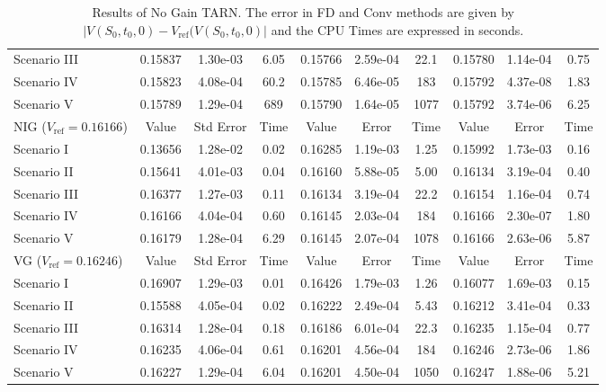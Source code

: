 \begin{table}
\begin{tabular}{l||c|c|c||c|c|c||c|c|c}
    Scenario III & 0.15837 & 1.30e-03 & 6.05 & 0.15766 & 2.59e-04 & 22.1 & 0.15780 & 1.14e-04 & 0.75 \\
    Scenario IV  & 0.15823 & 4.08e-04 & 60.2 & 0.15785 & 6.46e-05 & 183  & 0.15792 & 4.37e-08 & 1.83 \\
    Scenario V   & 0.15789 & 1.29e-04 & 689  & 0.15790 & 1.64e-05 & 1077 & 0.15792 & 3.74e-06 & 6.25 \\
         \midrule
      NIG ($V_\text{ref}=0.16166$) & Value & Std Error  & Time & Value & Error & Time & Value & Error & Time \\
      \midrule
    Scenario I   & 0.13656 & 1.28e-02 & 0.02 & 0.16285 & 1.19e-03 & 1.25 & 0.15992 & 1.73e-03 & 0.16\\
    Scenario II  & 0.15641 & 4.01e-03 & 0.04 & 0.16160 & 5.88e-05 & 5.00 & 0.16134 & 3.19e-04 & 0.40\\
    Scenario III & 0.16377 & 1.27e-03 & 0.11 & 0.16134 & 3.19e-04 & 22.2 & 0.16154 & 1.16e-04 & 0.74\\
    Scenario IV  & 0.16166 & 4.04e-04 & 0.60 & 0.16145 & 2.03e-04 & 184  & 0.16166 & 2.30e-07 & 1.80\\
    Scenario V   & 0.16179 & 1.28e-04 & 6.29 & 0.16145 & 2.07e-04 & 1078 & 0.16166 & 2.63e-06 & 5.87\\
         \midrule
      VG ($V_\text{ref}=0.16246$) & Value & Std Error  & Time & Value & Error & Time & Value & Error & Time \\
      \midrule
    Scenario I   & 0.16907 & 1.29e-03 & 0.01 & 0.16426 & 1.79e-03 & 1.26 & 0.16077 & 1.69e-03 & 0.15\\
    Scenario II  & 0.15588 & 4.05e-04 & 0.02 & 0.16222 & 2.49e-04 & 5.43 & 0.16212 & 3.41e-04 & 0.33\\
    Scenario III & 0.16314 & 1.28e-04 & 0.18 & 0.16186 & 6.01e-04 & 22.3 & 0.16235 & 1.15e-04 & 0.77\\
    Scenario IV  & 0.16235 & 4.06e-04 & 0.61 & 0.16201 & 4.56e-04 & 184  & 0.16246 & 2.73e-06 & 1.86\\
    Scenario V   & 0.16227 & 1.29e-04 & 6.04 & 0.16201 & 4.50e-04 & 1050 & 0.16247 & 1.88e-06 & 5.21\\
    \bottomrule
  \end{tabular}
  \vspace{5pt}
  \caption{\label{tab:res_ng} Results of No Gain TARN. The error in FD and Conv methods are given by $|V(S_0,t_0,0)-V_\text{ref}(V(S_0,t_0,0)|$ and the CPU Times are expressed in seconds.}
\end{table}


